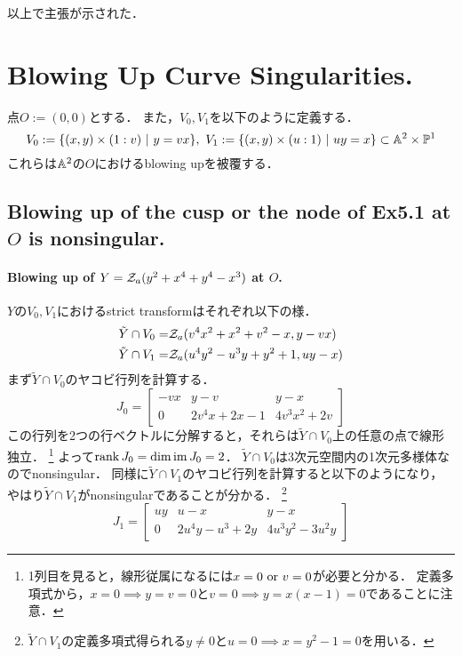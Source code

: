 \documentclass[a4paper]{jsarticle}
\begin{document}
    以上で主張が示された．

\section{Blowing Up Curve Singularities.} %
    点$O:=(0,0)$とする．
    また，$V_0, V_1$を以下のように定義する．
    \[ V_0:=\{(x,y) \times (1:v) ~|~ y=vx \},~ V_1:=\{(x,y) \times (u:1) ~|~ uy=x \} \subset \mathbb{A}^2 \times \mathbb{P}^1 \]
    これらは$\mathbb{A}^2$の$O$におけるblowing upを被覆する．

    \subsection{Blowing up of the cusp or the node of Ex5.1 at $O$ is nonsingular.}
    \paragraph{Blowing up of $Y=\mathcal{Z}_a(y^2+x^4+y^4-x^3)$ at $O$.}
    $Y$の$V_0, V_1$におけるstrict transformはそれぞれ以下の様．
    \begin{align*}
        \tilde{Y} \cap V_0=& \mathcal{Z}_a(v^4 x^2+x^2+v^2-x, y-vx) \\
        \tilde{Y} \cap V_1=& \mathcal{Z}_a(u^4 y^2-u^3y+y^2+1, uy-x)
    \end{align*}
    まず$\tilde{Y} \cap V_0$のヤコビ行列を計算する．
    \[
        J_0=
        \begin{bmatrix}
            -vx & y-v & y-x \\
            0 & 2v^4x+2x-1 & 4v^3x^2+2v
        \end{bmatrix}
    \]
    この行列を2つの行ベクトルに分解すると，それらは$\tilde{Y} \cap V_0$上の任意の点で線形独立．
    \footnote{1列目を見ると，線形従属になるには$x=0 \text{ or } v=0$が必要と分かる．
    定義多項式から，$x=0 \implies y=v=0$と$v=0 \implies y=x(x-1)=0$であることに注意．}
    よって$\operatorname{rank} J_0=\dim \operatorname{im} J_0=2$．
    $\tilde{Y} \cap V_0$は3次元空間内の1次元多様体なのでnonsingular．
    同様に$\tilde{Y} \cap V_1$のヤコビ行列を計算すると以下のようになり，
    やはり$\tilde{Y} \cap V_1$がnonsingularであることが分かる．
    \footnote{$\tilde{Y} \cap V_1$の定義多項式得られる$y \neq 0$と$u=0 \implies x=y^2-1=0$を用いる．}
    \[
        J_1=
        \begin{bmatrix}
            uy & u-x & y-x \\
            0 & 2u^4 y-u^3+2y & 4u^3 y^2-3u^2y
        \end{bmatrix}
    \]
\end{document}
